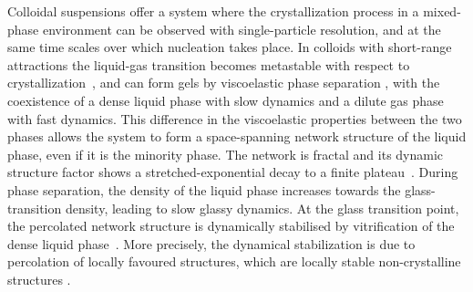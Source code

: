 \documentclass[preprint,amsmath,amssymb,superscriptaddress]{revtex4-1}
\begin{document}
Colloidal suspensions offer a system where the crystallization process in a mixed-phase environment can be observed with single-particle
resolution, and at the same time scales over which nucleation takes place. In colloids with short-range attractions the liquid-gas transition 
becomes metastable with respect to crystallization~\cite{anderson2002insights,lekkerkerker2011colloids}, and can form gels
by viscoelastic phase separation \cite{tanaka1999colloid,tanaka2000viscoelastic}, with the coexistence of a dense liquid phase with slow dynamics and a dilute gas phase with fast dynamics. 
This difference in the viscoelastic properties between the two phases allows the system to form a space-spanning 
network structure of the liquid phase, even if it is the minority phase. The network is fractal and its dynamic structure factor shows a stretched-exponential decay to a finite
plateau~\cite{krall1998internal,solomon2001dynamic,romer2000sol}. 
During phase separation, the density of the liquid phase increases towards the glass-transition density, leading to slow glassy dynamics.
At the glass transition point, the percolated network structure is dynamically stabilised by vitrification 
of the dense liquid phase~\cite{pusey1993dynamics,piazza1994phase,ilett1995phase,verhaegh1997transient,tanaka1999colloid,foffi2002,buzzaccaro2007sticky,zaccarelli2007,lu2008gelation,zaccarelli2008gelation,testard2011}.  
More precisely, the dynamical stabilization is due to percolation of locally favoured structures, which are locally stable non-crystalline structures \cite{royall2008g}.
\end{document}
